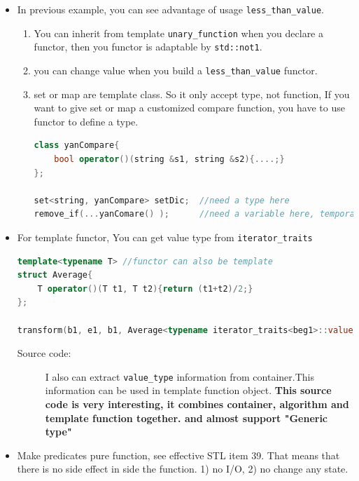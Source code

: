 \documentclass[a4paper,11pt,twoside]{book}
\begin{document}
\begin{itemize}
   \item In previous example, you can see advantage of usage \texttt{less\_than\_value}.
   \begin{enumerate}
   \item You can inherit from  template \texttt{unary\_function} when you declare a functor, then you functor is adaptable by \texttt{std::not1}.

   \item you can change value when you build a \texttt{less\_than\_value} functor.

   \item set or map are template class. So it only accept type, not function, If you want to give set or map a customized compare function,  you have to use functor to define a type.
\begin{lstlisting}[frame=single, language=c++]
class yanCompare{
    bool operator()(string &s1, string &s2){....;}
};

set<string, yanCompare> setDic;  //need a type here
remove_if(...yanComare() );      //need a variable here, temporary is OK
\end{lstlisting}
 
\end{enumerate}

	\item For template functor, You can get value type from \texttt{iterator\_traits}
\begin{lstlisting}[frame=single, language=c++]
template<typename T> //functor can also be template 
struct Average{
	T operator()(T t1, T t2){return (t1+t2)/2;}
};

transform(b1, e1, b1, Average<typename iterator_traits<beg1>::value_type>());	
\end{lstlisting}
\begin{description}
	\item[Source code:] I also can extract \texttt{value\_type} information from container.This information can be used in template function object. \textbf{This source code is very interesting, it combines container, algorithm and template function together. and almost support "Generic type"}
\end{description}

	\item Make predicates pure function, see effective STL item 39. That means that there is no side effect in side the function. 1) no I/O, 2) no change any state.



\end{itemize}
\end{document}
